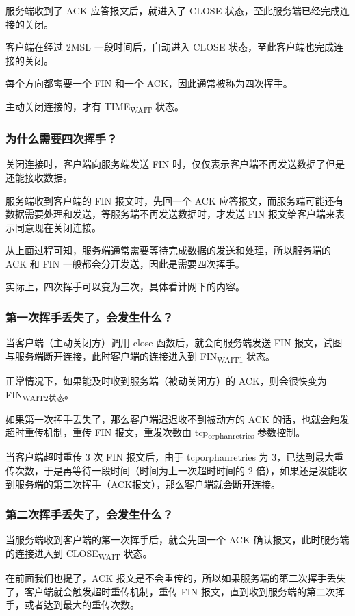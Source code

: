 \documentclass[11pt]{article}
\begin{document}
服务端收到了 ACK 应答报文后，就进入了 CLOSE 状态，至此服务端已经完成连接的关闭。

客户端在经过 2MSL 一段时间后，自动进入 CLOSE 状态，至此客户端也完成连接的关闭。

每个方向都需要一个 FIN 和一个 ACK，因此通常被称为四次挥手。

主动关闭连接的，才有 TIME\textsubscript{WAIT} 状态。
\subsubsection{为什么需要四次挥手？}
\label{sec:orga375566}
关闭连接时，客户端向服务端发送 FIN 时，仅仅表示客户端不再发送数据了但是还能接收数据。

服务端收到客户端的 FIN 报文时，先回一个 ACK 应答报文，而服务端可能还有数据需要处理和发送，等服务端不再发送数据时，才发送 FIN 报文给客户端来表示同意现在关闭连接。

从上面过程可知，服务端通常需要等待完成数据的发送和处理，所以服务端的 ACK 和 FIN 一般都会分开发送，因此是需要四次挥手。

实际上，四次挥手可以变为三次，具体看计网下的内容。
\subsubsection{第一次挥手丢失了，会发生什么？}
\label{sec:org6391b9a}
当客户端（主动关闭方）调用 close 函数后，就会向服务端发送 FIN 报文，试图与服务端断开连接，此时客户端的连接进入到 FIN\textsubscript{WAIT}\textsubscript{1} 状态。

正常情况下，如果能及时收到服务端（被动关闭方）的 ACK，则会很快变为 FIN\textsubscript{WAIT2状态}。

如果第一次挥手丢失了，那么客户端迟迟收不到被动方的 ACK 的话，也就会触发超时重传机制，重传 FIN 报文，重发次数由 tcp\textsubscript{orphan}\textsubscript{retries} 参数控制。

当客户端超时重传 3 次 FIN 报文后，由于 tcporphanretries 为 3，已达到最大重传次数，于是再等待一段时间（时间为上一次超时时间的 2 倍），如果还是没能收到服务端的第二次挥手（ACK报文），那么客户端就会断开连接。
\subsubsection{第二次挥手丢失了，会发生什么？}
\label{sec:org7281405}
当服务端收到客户端的第一次挥手后，就会先回一个 ACK 确认报文，此时服务端的连接进入到 CLOSE\textsubscript{WAIT} 状态。

在前面我们也提了，ACK 报文是不会重传的，所以如果服务端的第二次挥手丢失了，客户端就会触发超时重传机制，重传 FIN 报文，直到收到服务端的第二次挥手，或者达到最大的重传次数。
\end{document}
